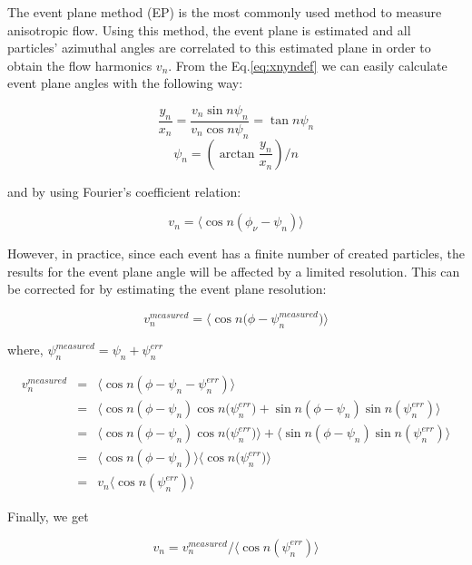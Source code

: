 The event plane method (EP) is the most commonly used method to measure anisotropic flow. Using this method, the event plane is estimated and all particles' azimuthal angles are correlated to this estimated plane in order to obtain the flow harmonics $v_n$. From the Eq.\ref{eq:xnyndef} we can easily calculate event plane angles with the following way:


\begin{equation}
\frac{y_n}{x_n}=\frac{v_n\sin{n\psi_n}}{v_n\cos{n\psi_n}}=\tan{n\psi_n}
\end{equation}
\begin{equation}
\psi_n=(\arctan{\frac{y_n}{x_n}})/n
\end{equation}


and by using Fourier's coefficient relation:

\begin{equation}
v_n=\langle\cos{n(\phi_\nu - \psi_n)}\rangle 
\label{vndef}
\end{equation}
\smallskip


However, in practice, since each event has a finite number of created particles, the results for the event plane angle will be affected by a limited resolution. This can be corrected for by estimating the event plane resolution:

\begin{equation}
v_n^{measured}=\langle\cos{n({\phi-\psi_n^{measured})}}\rangle
\end{equation}
\smallskip

where, $\psi_n^{measured} = \psi_n + \psi_n^{err}$

\begin{eqnarray}
v_n^{measured}&=&\langle\cos{n(\phi-\psi_n-\psi_n^{err})}\rangle \\
&=&\langle\cos{n(\phi-\psi_n)}\cos{n(\psi_n^{err}})+\sin{n(\phi-\psi_n)}\sin{n(\psi_n^{err})}\rangle \\
&=&\langle\cos{n(\phi-\psi_n)}\cos{n(\psi_n^{err}})\rangle+\langle\sin{n(\phi-\psi_n)}\sin{n(\psi_n^{err})}\rangle \\
&=&\langle\cos{n(\phi-\psi_n)}\rangle\langle\cos{n(\psi_n^{err}})\rangle \\
&=&v_n\langle\cos{n(\psi_n^{err})}\rangle
\end{eqnarray}

Finally, we get 

\begin {equation}
v_n = v_n^{measured}/\langle\cos{n(\psi_n^{err})}\rangle
\end {equation}
\smallskip


